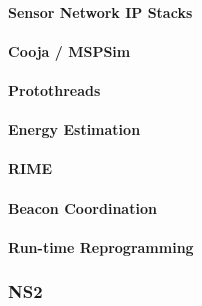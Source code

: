 \paragraph{Sensor Network IP Stacks}
\cite{ko2011beyond} %
\cite{dunkels2009efficient} %
\cite{Durvy:2008:MSN:1460412.1460483} %
\cite{dunkels2003full} %

\paragraph{Cooja / MSPSim}
\cite{Eriksson:2009:CIT:1537614.1537650} %

\paragraph{Protothreads}
\cite{Dunkels:2006:PSE:1182807.1182811} %

\paragraph{Energy Estimation}
\cite{Dunkels:2007:SOE:1278972.1278979} %

\paragraph{RIME}
\cite{Dunkels:2007:ACA:1322263.1322295} %

\paragraph{Beacon Coordination}
\cite{Dunkels:2011:ALB:1966251.1966270} %

\paragraph{Run-time Reprogramming}
\cite{Dunkels:2006:RDL:1182807.1182810} %

\subsubsection{NS2}

